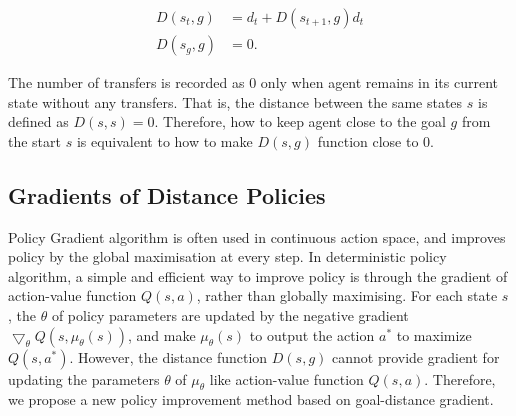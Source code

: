 \documentclass[8pt,twoside,a4paper]{article}
\begin{document}
\begin{equation}
\begin{aligned}
D(s_t,g)&=d_t+D(s_{t+1},g)d_t\\
D(s_g,g)&=0.
\end{aligned}
\end{equation}
\par The number of transfers is recorded as 0 only when agent remains in its current state without any transfers. That is, the distance between the same states $s$ is defined as $D(s,s)=0$. Therefore, how to keep agent close to the goal $g$ from the start $s$ is equivalent to how to make $D(s,g)$ function close to 0.
\subsection{Gradients of Distance Policies}
Policy Gradient algorithm is often used in continuous action space, and improves policy by the global maximisation at every step. In deterministic policy algorithm, a simple and efficient way to improve policy is through the gradient of action-value function $Q(s,a)$, rather than globally maximising. For each state $s$, the $\theta$ of policy parameters are updated by the negative gradient $\bigtriangledown_{\theta } Q(s,\mu_{\theta}(s))$, and make $\mu_{\theta}(s)$ to output the action $a^*$ to maximize $Q(s,a^*)$. However, the distance function $D(s,g)$ cannot provide gradient for updating the parameters $\theta$ of $\mu_{\theta}$ like action-value function $Q(s,a)$. Therefore, we propose a new policy improvement method based on goal-distance gradient.
\end{document}
